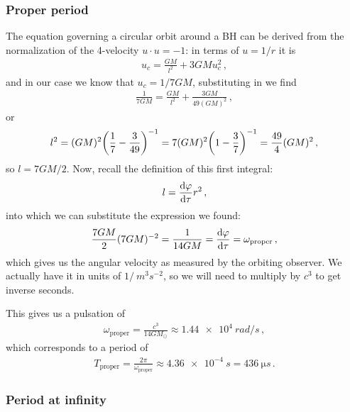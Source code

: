 \documentclass[main.tex]{subfiles}
\begin{document}
\subsubsection{Proper period}

The equation governing a circular orbit around a BH can be derived from the normalization of the 4-velocity \(u \cdot u = -1\): in terms of \(u = 1/r\) it is 
%
\begin{align}
  u_c = \frac{GM}{l^2} + 3 GM u_c^2
\,,
\end{align}
%
and in our case we know that \(u_c = 1/7GM\), substituting in we find 
%
\begin{align}
  \frac{1}{7GM} = \frac{GM}{l^2} + \frac{3GM}{49 (GM)^2}
\,,
\end{align}
%
or 
%
\begin{align}
  l^2 = (GM)^2 \qty(\frac{1}{7} - \frac{3}{49})^{-1}
  = 7 (GM)^2 \qty(1 - \frac{3}{7})^{-1} = \frac{49}{4} (GM)^2
\,, 
\end{align}
%
so \(l = 7GM/2\). Now, recall the definition of this first integral: 
%
\begin{align}
  l = \dv{\varphi }{\tau } r^2
\,,
\end{align}
%
into which we can substitute the expression we found: 
%
\begin{align}
  \frac{7GM}{2} (7GM)^{-2} = \frac{1}{14GM} =  \dv{\varphi }{\tau } = \omega_{\text{proper}}
\,,
\end{align}
%
which gives us the angular velocity as measured by the orbiting observer. We actually have it in units of $1/\SI{}{m^3 s^{-2}}$, so we will need to multiply by \(c^3\) to get inverse seconds.

This gives us a pulsation of 
%
\begin{align}
  \omega _{\text{proper}} = \frac{c^3}{14GM_{\odot}} \approx 
  \SI{1.44e4}{rad/s}
\,,
\end{align}
%
which corresponds to a period of 
%
\begin{align}
  T _{\text{proper}} = \frac{2\pi}{\omega _{\text{proper}}} \approx \SI{4.36e-4}{s} = \SI{436}{\micro s}
\,.
\end{align}

\subsubsection{Period at infinity}
\end{document}
